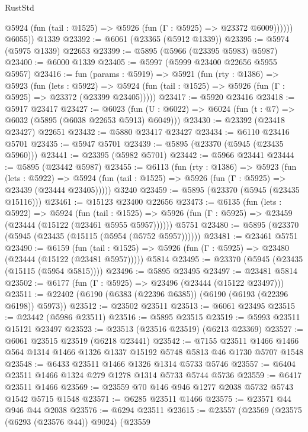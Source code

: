 \begin{lexlean}{RustStd}
\begin{coremodule}
{{              @5924 (fun (tail : @1525) => @5926 (fun (Γ : @5925) => @23372 @6009))))))
        @6055))
    @1339
@23392 := @6061 (@23365 (@5912 @1339))
@23395 := @5974 (@5975 @1339) @22653
@23399 := @5895 (@5966 (@23395 @5983) @5987)
@23400 := @6000 @1339
@23405 := @5997 (@5999 @23400 @22656 @5955 @5957)
@23416 := fun (params : @5919) =>
  @5921
    (fun (rty : @1386) =>
    @5923
      (fun (lets : @5922) =>
      @5924 (fun (tail : @1525) => @5926 (fun (Γ : @5925) => @23372 (@23399 @23405)))))
@23417 := @5920 @23416
@23418 := @5917 @23417
@23427 := @6023
    (fun (U : @6022) => @6024 (fun (t : @7) => @6032 (@5895 (@6038 @22653 @5913) @6049)))
@23430 := @23392 (@23418 @23427) @22651
@23432 := @5880 @23417 @23427
@23434 := @6110 @23416 @5701
@23435 := @5947 @5701
@23439 := @5895 (@23370 (@5945 (@23435 @5960)))
@23441 := @23395 (@5982 @5701)
@23442 := @5966 @23441
@23444 := @5895 (@23442 @5987)
@23455 := @6113
    (fun (rty : @1386) =>
    @5923
      (fun (lets : @5922) =>
      @5924 (fun (tail : @1525) => @5926 (fun (Γ : @5925) => @23439 (@23444 @23405)))))
    @3240
@23459 := @5895 (@23370 (@5945 (@23435 @15116)))
@23461 := @15123 @23400 @22656
@23473 := @6135
    (fun (lets : @5922) =>
    @5924
      (fun (tail : @1525) =>
      @5926 (fun (Γ : @5925) => @23459 (@23444 (@15122 (@23461 @5955 @5957))))))
    @5751
@23480 := @5895 (@23370 (@5945 (@23435 (@15115 (@5954 (@5752 @5957))))))
@23481 := @23461 @5751
@23490 := @6159
    (fun (tail : @1525) => @5926 (fun (Γ : @5925) => @23480 (@23444 (@15122 (@23481 @5957)))))
    @5814
@23495 := @23370 (@5945 (@23435 (@15115 (@5954 @5815))))
@23496 := @5895 @23495
@23497 := @23481 @5814
@23502 := @6177 (fun (Γ : @5925) => @23496 (@23444 (@15122 @23497)))
@23511 := @22402 (@6190 (@6383 (@22396 @6385)) (@6190 (@6193 (@22396 @6198)) @5973))
@23512 := @23502 @23511
@23513 := @6061 @23495
@23515 := @23442 (@5986 @23511)
@23516 := @5895 @23515
@23519 := @5993 @23511 @15121 @23497
@23523 := @23513 (@23516 @23519) (@6213 @23369)
@23527 := @6061 @23515 @23519 (@6218 @23441)
@23542 := @7155
    @23511
    @1466
    @1466
    @564
    @1314
    @1466
    @1326
    @1337
    @15192
    @5748
    @5813
    @46
    @1730
    @5707
    @1548
@23548 := @6433 @23511 @1466 @1326 @1314 @5733 @5746
@23557 := @6404 @23511 @1466 @1324 @279 @1278 @1314 @5733 @5744 @5736
@23559 := @6417 @23511 @1466
@23569 := @23559 @70 @146 @946 @1277 @2038 @5732 @5743 @1542 @5715 @1548
@23571 := @6285 @23511 @1466
@23575 := @23571 @44 @946 @44 @2038
@23576 := @6294 @23511
@23615 := @23557
    (@23569
      (@23575 (@6293 (@23576 @44)) @9024)
      (@23559
}}
\end{coremodule}
\end{lexlean}
